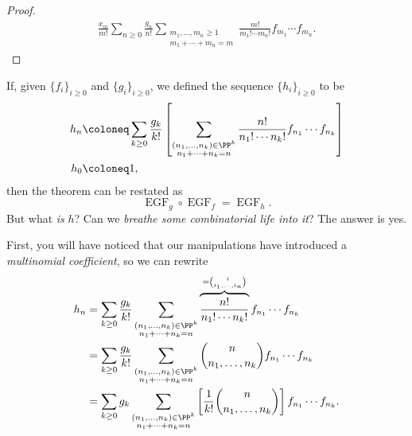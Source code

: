 \documentclass{article}
\DeclareMathOperator{\EGF}{EGF}
\begin{document}
\begin{proof}
\begin{align*}
                                 \frac{x_m}{m!} 
                                 \sum_{n\geq0}
                                 \frac{g_n}{n!}
                                 \sum_{
                                     \substack{
                                         m_1,\ldots,m_n\geq1 \\
                                         m_1+\cdots+m_n=m
                                     }
                                 }
                                 \frac
                                 {m!}
                                 {m_1!\cdots m_n!}
                                 f_{m_1}\cdots f_{m_n}.
    \end{align*}
\end{proof}

If, given $\{f_i\}_{i\geq0}$ and $\{g_i\}_{i\geq0}$, we defined the sequence $\{h_i\}_{i\geq0}$ to be
\begin{align*}
    h_n 
    &\coloneq 
    \sum_{k\geq0}
    \frac{g_k}{k!}
    \left[
            \sum_{\substack{(n_1,\ldots,n_k)\in\PP^k\\n_1+\cdots+n_k=n}}
            \frac{n!}{n_1!\cdots n_k!}f_{n_1}\cdots f_{n_k}
    \right] \\
    h_0
    &\coloneq
    1,
\end{align*}
then the theorem can be restated as
\[
    \EGF_g \circ \EGF_f = \EGF_h.
\]
But what \textit{is} $h$?
Can we \textit{breathe some combinatorial life into it}?
The answer is yes.

First, you will have noticed that our manipulations have introduced a \textit{multinomial coefficient}, so we can rewrite
\begin{align*}
    h_n 
    &=
    \sum_{k\geq0}
    \frac{g_k}{k!}
    \sum_{\substack{(n_1,\ldots,n_k)\in\PP^k\\n_1+\cdots+n_k=n}}
    \overbrace{
        \frac{n!}{n_1!\cdots n_k!}
    }^{=\binom{i}{i_1,\ldots,i_n}}
    f_{n_1}\cdots f_{n_k}
    \\
    &=
    \sum_{k\geq0}
    \frac{g_k}{k!}
    \sum_{\substack{(n_1,\ldots,n_k)\in\PP^k\\n_1+\cdots+n_k=n}}
    \binom{n}{n_1,\ldots,n_k}
    f_{n_1}\cdots f_{n_k}
    \\
    &=
    \sum_{k\geq0}
    g_k
    \sum_{\substack{(n_1,\ldots,n_k)\in\PP^k\\n_1+\cdots+n_k=n}}
    \left[
        \frac{1}{k!}
        \binom{n}{n_1,\ldots,n_k}
    \right]
    f_{n_1}\cdots f_{n_k}.
\end{align*}
\end{document}
